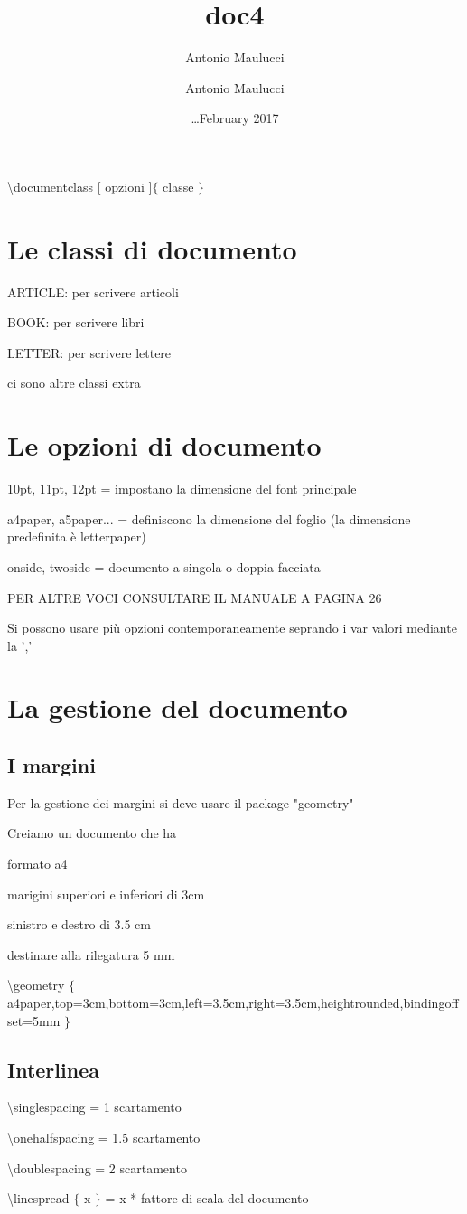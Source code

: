 \documentclass[a4paper, 12pt]{article}
\title{doc4}
\author{Antonio Maulucci \and Antonio Maulucci}
\date{\dots February 2017}
\begin{document}
\maketitle

\backslash documentclass $[$ opzioni $] \{$ classe $\}$

\section{Le classi di documento}


ARTICLE: per scrivere articoli

BOOK: per scrivere libri

LETTER: per scrivere lettere

ci sono altre classi extra

\section{Le opzioni di documento}

10pt, 11pt, 12pt = impostano la dimensione del font principale

a4paper, a5paper... = definiscono la dimensione del foglio (la dimensione predefinita è letterpaper)

onside, twoside = documento a singola o doppia facciata

PER ALTRE VOCI CONSULTARE IL MANUALE A PAGINA 26

Si possono usare più opzioni contemporaneamente seprando i var valori mediante la ','

\section{La gestione del documento}

\subsection{I margini}

Per la gestione dei margini si deve usare il package "geometry"

Creiamo un documento che ha

formato a4

marigini superiori e inferiori di 3cm

sinistro e destro di 3.5 cm

destinare alla rilegatura 5 mm

\backslash geometry $\{$ a4paper,top=3cm,bottom=3cm,left=3.5cm,right=3.5cm,heightrounded,bindingoffset=5mm $\}$

\subsection{Interlinea}

\backslash singlespacing = 1 scartamento

\backslash onehalfspacing = 1.5 scartamento

\backslash doublespacing = 2 scartamento

\backslash linespread $\{$ x $\}$ = x * fattore di scala del documento
\end{document}
